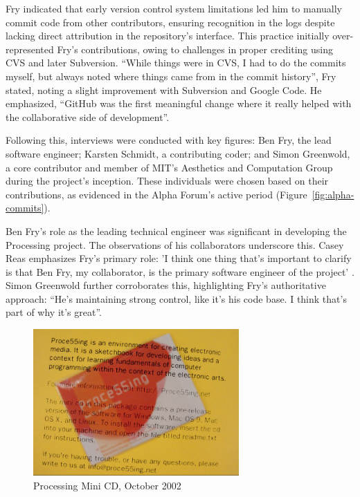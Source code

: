 Fry indicated that early version control system limitations led him to manually commit code from other contributors, ensuring recognition in the logs despite lacking direct attribution in the repository’s interface. This practice initially over-represented Fry’s contributions, owing to challenges in proper crediting using CVS and later Subversion. \enquote{While things were in CVS, I had to do the commits myself, but always noted where things came from in the commit history}, Fry stated, noting a slight improvement with Subversion and Google Code. He emphasized, \enquote{GitHub was the first meaningful change where it really helped with the collaborative side of development}.

Following this, interviews were conducted with key figures: Ben Fry, the lead software engineer; Karsten Schmidt, a contributing coder; and Simon Greenwold, a core contributor and member of MIT’s Aesthetics and Computation Group during the project’s inception. These individuals were chosen based on their contributions, as evidenced in the Alpha Forum’s active period (Figure~\ref{fig:alpha-commits}).

Ben Fry’s role as the leading technical engineer was significant in developing the Processing project. The observations of his collaborators underscore this. Casey Reas emphasizes Fry’s primary role: ’I think one thing that’s important to clarify is that Ben Fry, my collaborator, is the primary software engineer of the project’ \parencite[p. 330]{conradGraphicDesignPostdigital2021}. Simon Greenwold further corroborates this, highlighting Fry’s authoritative approach: \enquote{He’s maintaining strong control, like it’s his code base. I think that’s part of why it’s great}.

\begin{figure}
	\includegraphics[width=0.7\textwidth]{images/processing-mini-cd.png}
	\caption[Mini CD]{Processing Mini CD, October 2002}
	\label{fig:processing-cd}
\end{figure}

